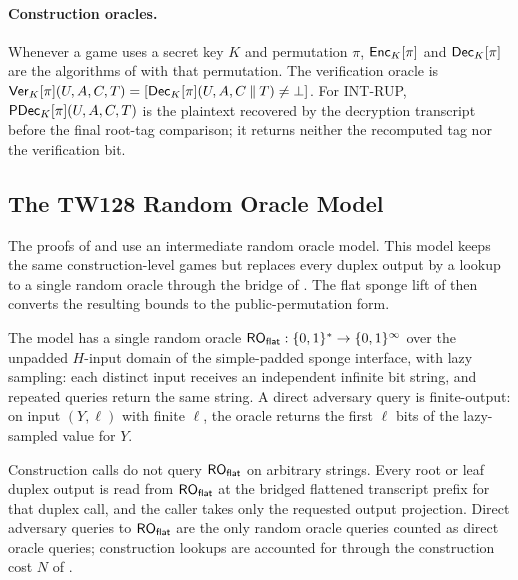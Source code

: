 \paragraph{Construction oracles.}
Whenever a game uses a secret key $K$ and permutation $\pi$, $\mathsf{Enc}_K[\pi]$
and $\mathsf{Dec}_K[\pi]$ are the algorithms of  with that
permutation. The verification oracle is
$\mathsf{Ver}_K[\pi](U, A, C, T) = [\mathsf{Dec}_K[\pi](U, A, C \mathbin{\|} T) \neq \bot]$.
For \textsf{INT-RUP}, $\mathsf{PDec}_K[\pi](U, A, C, T)$ is the plaintext recovered by
the decryption transcript before the final root-tag comparison; it returns
neither the recomputed tag nor the verification bit.

\subsection{The TW128 Random Oracle Model}
\label{sec:ro-model}

The proofs of  and
 use an intermediate random oracle model. This
model keeps the same construction-level games but replaces every duplex output
by a lookup to a single random oracle through the \cite{BDPV11} bridge of
. The flat sponge lift of  then
converts the resulting bounds to the public-permutation form.

The model has a single random oracle $\mathsf{RO}_{\mathsf{flat}} : \{0,1\}^* \to
\{0,1\}^\infty$ over the unpadded $H$-input domain of the \cite{BDPV08}
simple-padded sponge interface, with lazy sampling: each distinct
input receives an independent infinite bit string, and repeated queries
return the same string. A direct adversary query is finite-output: on
input $(Y, \ell)$ with finite $\ell$, the oracle returns the first
$\ell$ bits of the lazy-sampled value for $Y$.

Construction calls do not query $\mathsf{RO}_{\mathsf{flat}}$ on arbitrary strings. Every root
or leaf duplex output is read from $\mathsf{RO}_{\mathsf{flat}}$ at the bridged flattened
transcript prefix for that duplex call, and the caller takes only the
requested output projection. Direct adversary queries to $\mathsf{RO}_{\mathsf{flat}}$ are the
only random oracle queries counted as direct oracle queries; construction
lookups are accounted for through the construction cost $N$ of
.

